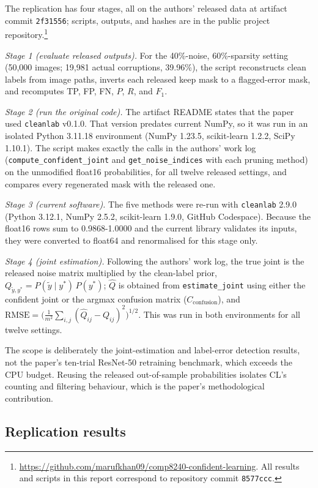 \documentclass[11pt]{article}
\newcommand{\cleanlab}{\texttt{cleanlab}}
\begin{document}
The replication has four stages, all on the authors' released data at
artifact commit \texttt{2f31556}; scripts, outputs, and hashes are in the
public project repository.\footnote{
\url{https://github.com/marufkhan09/comp8240-confident-learning}. All
results and scripts in this report correspond to repository commit
\texttt{8577ccc}.}

\emph{Stage 1 (evaluate released outputs).} For the 40\%-noise, 60\%-sparsity
setting (50,000 images; 19,981 actual corruptions, 39.96\%), the script
reconstructs clean labels from image paths, inverts each released keep mask
to a flagged-error mask, and recomputes TP, FP, FN, $P$, $R$, and $F_1$.

\emph{Stage 2 (run the original code).} The artifact README states that the
paper used \cleanlab{} v0.1.0. That version predates current NumPy, so it was
run in an isolated Python 3.11.18 environment (NumPy 1.23.5, scikit-learn
1.2.2, SciPy 1.10.1). The script makes exactly the calls in the authors' work
log (\texttt{compute\_confident\_joint} and \texttt{get\_noise\_indices} with
each pruning method) on the unmodified float16 probabilities, for all twelve
released settings, and compares every regenerated mask with the released one.

\emph{Stage 3 (current software).} The five methods were re-run with
\cleanlab{} 2.9.0 (Python 3.12.1, NumPy 2.5.2, scikit-learn 1.9.0, GitHub
Codespace). Because the float16 rows sum to 0.9868-1.0000 and the current
library validates its inputs, they were converted to float64 and
renormalised for this stage only.

\emph{Stage 4 (joint estimation).} Following the authors' work log, the
true joint is the released noise matrix multiplied by the clean-label prior,
$Q_{\tilde{y},y^*}=P(\tilde{y}\mid y^*)\,P(y^*)$; $\hat{Q}$ is obtained from
\texttt{estimate\_joint} using either the confident joint or the
argmax confusion matrix ($C_{\text{confusion}}$), and
$\text{RMSE}=\big(\frac{1}{m^2}\sum_{i,j}(\hat{Q}_{ij}-Q_{ij})^2\big)^{1/2}$.
This was run in both environments for all twelve settings.

The scope is deliberately the joint-estimation and label-error detection
results, not the paper's ten-trial ResNet-50 retraining benchmark, which
exceeds the CPU budget.
Reusing the released out-of-sample probabilities isolates CL's counting and
filtering behaviour, which is the paper's methodological contribution.

\subsection{Replication results}
\end{document}

